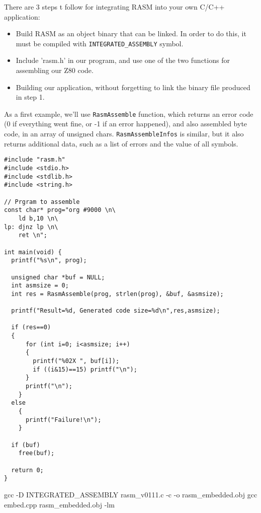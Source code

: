 \begin{xen}
There are 3 steps t follow for integrating  RASM into your own C/C++ application:
\begin{itemize}
\item Build RASM as an object binary that can be linked. In order to do this, it must be compiled with  \texttt{INTEGRATED\_ASSEMBLY} symbol.
\item Include 'rasm.h' in our program, and use one of the two functions for assembling our Z80 code.
\item Building our application, without forgetting to link the binary file produced in step 1.
\end{itemize}

As a first example, we'll use \texttt{RasmAssemble} function, which returns an error code (0 if everything went fine, or -1 if an error happened), and also assembled byte code, in an array of unsigned chars.
\texttt{RasmAssembleInfos} is similar, but it also returns additional data, such as a list of errors and the value of all symbols.
\end{xen}


\begin{verbatim}
#include "rasm.h"
#include <stdio.h>
#include <stdlib.h>
#include <string.h>

// Prgram to assemble
const char* prog="org #9000 \n\
    ld b,10 \n\
lp: djnz lp \n\
    ret \n";

int main(void) {
  printf("%s\n", prog);

  unsigned char *buf = NULL;
  int asmsize = 0;
  int res = RasmAssemble(prog, strlen(prog), &buf, &asmsize);

  printf("Result=%d, Generated code size=%d\n",res,asmsize);

  if (res==0)
  {
      for (int i=0; i<asmsize; i++)
      {
        printf("%02X ", buf[i]);
        if ((i&15)==15) printf("\n");
      }
      printf("\n");
    }
  else
    {
      printf("Failure!\n");
    }

  if (buf)
    free(buf);

  return 0;
}
\end{verbatim}


\begin{code}
gcc -D INTEGRATED\_ASSEMBLY rasm\_v0111.c -c -o rasm\_embedded.obj
gcc embed.cpp rasm\_embedded.obj -lm
\end{code}

